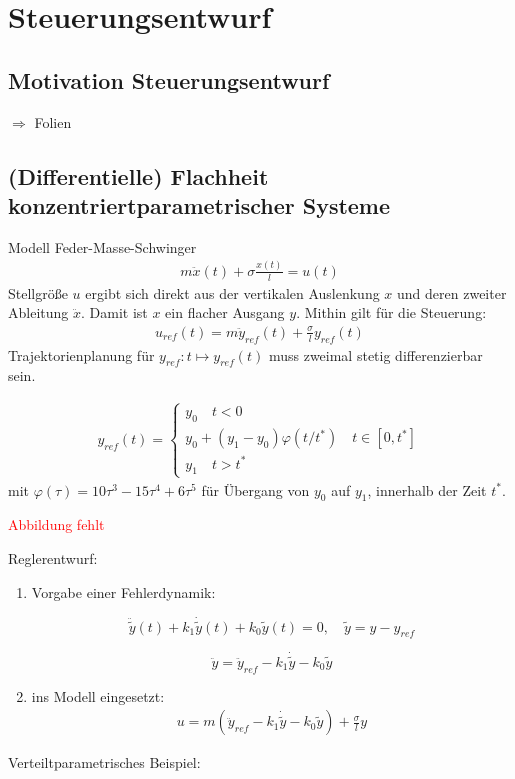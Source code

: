 \newpage
\section{Steuerungsentwurf}
\subsection{Motivation Steuerungsentwurf}
$\Rightarrow$ Folien

\subsection{(Differentielle) Flachheit konzentriertparametrischer Systeme}
Modell Feder-Masse-Schwinger 
\begin{align*}
m\ddot{x}(t)+\sigma \frac{x(t)}{l} = u(t)
\end{align*}
Stellgröße $u$ ergibt sich direkt aus der vertikalen Auslenkung $x$ und deren zweiter Ableitung $\ddot{x}$.
Damit ist $x$ ein flacher Ausgang $y$. Mithin gilt für die Steuerung:
\begin{align*}
u_{ref}(t) =  m \ddot{y}_{ref}(t) +\frac{\sigma}{l}y_{ref}(t)
\end{align*}
Trajektorienplanung für $y_{ref}: t \mapsto y_{ref}(t)$ muss zweimal stetig differenzierbar sein.
\begin{bsp}
\begin{align*}
y_{ref}(t) = \begin{cases} y_0 \quad t<0 \\ y_0 +(y_1-y_0)\varphi(t/t^*) \quad t\in [0,t^*] \\ y_1 \quad t>t^* \end{cases}
\end{align*}
mit $\varphi(\tau) = 10 \tau^3-15\tau^4+6\tau^5$ für Übergang von $y_0$ auf $y_1$, innerhalb der Zeit $t^*$.

\textcolor{red}{Abbildung fehlt}

Reglerentwurf: 
\begin{enumerate}
\item Vorgabe einer Fehlerdynamik:

\[\ddot{\tilde{y}}(t)+k_1\dot{\tilde{y}}(t)+k_0 \tilde{y}(t)= 0, \quad\tilde{y}=y-y_{ref}\]

\[\ddot{y}=\ddot{y}_{ref}-k_1\dot{\tilde{y}}-k_0 \tilde{y}\]

\item ins Modell eingesetzt:
\begin{align*}
u=m(\ddot{y}_{ref}-k_1\dot{\tilde{y}}-k_0 \tilde{y})+\frac{\sigma}{l}y
\end{align*}
\end{enumerate}
\end{bsp}
Verteiltparametrisches Beispiel:

